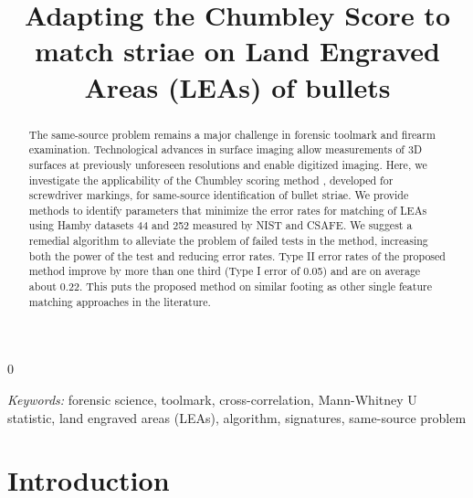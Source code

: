 \documentclass[12pt]{article}
\newcommand{\blind}{0}
\begin{document}
\def\spacingset#1{\renewcommand{\baselinestretch}%
{#1}\small\normalsize} \spacingset{1}




\blind
{
  \title{\LARGE\bf Adapting the Chumbley Score to match striae on Land Engraved Areas (LEAs) of bullets}
  \maketitle
} \fi


\bigskip
\begin{abstract}
The same-source problem remains a major challenge in forensic toolmark
and firearm examination. Technological advances in surface imaging allow
measurements of 3D surfaces at previously unforeseen resolutions and
enable digitized imaging. Here, we investigate the applicability of the
Chumbley scoring method \citep{hadler}, developed for screwdriver
markings, for same-source identification of bullet striae. We provide
methods to identify parameters that minimize the error rates for
matching of LEAs using Hamby datasets 44 and 252 measured by NIST and
CSAFE. We suggest a remedial algorithm to alleviate the problem of
failed tests in the method, increasing both the power of the test and
reducing error rates. Type II error rates of the proposed method improve
by more than one third (Type I error of 0.05) and are on average about
0.22. This puts the proposed method on similar footing as other single
feature matching approaches in the literature.
\end{abstract}

\noindent%
{\it Keywords:} forensic science, toolmark, cross-correlation, Mann-Whitney U statistic, land engraved areas (LEAs), algorithm, signatures, same-source problem
\vfill

\newpage
\spacingset{1.45} %

\newcommand{\cited}[1]{{\textcolor{red}{#1}}}

\setlength\parindent{0pt}

\tableofcontents
\newpage

\section{Introduction}\label{introduction}
\end{document}
